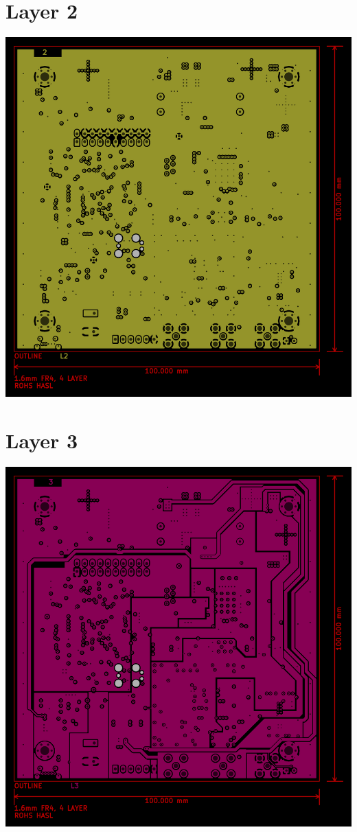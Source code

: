 \documentclass[article,oneside]{memoir}
\begin{document}
\begin{appendices}
    \newpage \section{Layer 2}
    \begin{vplace}\includegraphics[width=6.5in]{render_lyr2}\end{vplace}
    \newpage \section{Layer 3}
    \begin{vplace}\includegraphics[width=6.5in]{render_lyr3}\end{vplace}

\end{appendices}
\end{document}
